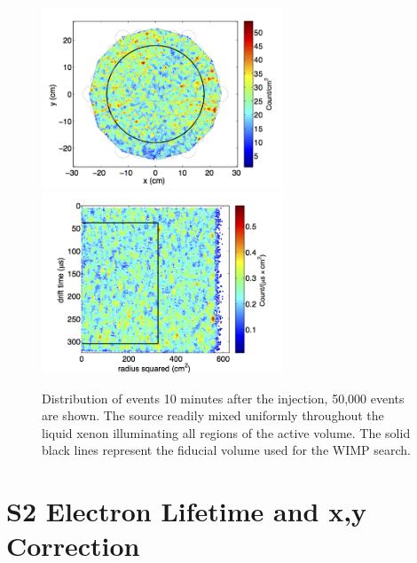 \begin{figure}[h!]\centering
\includegraphics[width=72mm]{Chapter_XYZ_Corr/Thesis_Corr_Plots/Kr_XY_density.png}
\includegraphics[width=72mm]{Chapter_XYZ_Corr/Thesis_Corr_Plots/Kr_RZ_density.png}
\caption{Distribution of \KrCal events 10 minutes after the injection, 50,000 events are shown. The source readily mixed uniformly throughout the liquid xenon illuminating all regions of the active volume. The solid black lines represent the fiducial volume used for the WIMP search. }
\label{fig:Kr_Dist}
\end{figure}




\section{S2 Electron Lifetime and x,y Correction}


